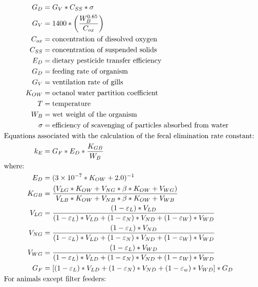 \documentclass[10pt]{article}
\begin{document}
\begin{align*}
G_{D} & = G_{V}*C_{SS}*\sigma \nonumber \\
G_{V} & = 1400*\left(\frac{W_{B}^{0.65}}{C_{ox}}\right) \nonumber \\
C_{ox} & = \text{concentration of dissolved oxygen} \nonumber\\
C_{SS} & = \text{concentration of suspended solids} \nonumber\\
E_{D} & = \text{dietary pesticide transfer efficiency} \nonumber\\
G_{D} & = \text{feeding rate of organism} \nonumber\\
G_{V} & = \text{ventilation rate of gills} \nonumber\\
K_{OW} & = \text{octanol water partition coefficient} \nonumber\\
T & = \text{temperature } \nonumber\\
W_{B} & = \text{wet weight of the organism} \nonumber\\
\sigma & = \text{efficiency of scavenging of particles absorbed from water} \nonumber\\
&    \hspace{-.75in}  \text{Equations associated with the calculation of the fecal elimination rate constant:} \nonumber \\
k_{E} & = G_{F}*E_{D}*\frac{K_{GB}}{W_{B}}\nonumber \\
&    \hspace{-.75in}  \text{where:} \nonumber \\
E_{D} & = (\num{.0000003}*K_{OW}+2.0)^{-1} \nonumber \\
K_{GB} & = \frac{(V_{LG}*K_{OW}+V_{NG}*\beta*K_{OW}+V_{WG})}{V_{LB}*K_{OW}+V_{NB}*\beta*K_{OW}+V_{WB}}\nonumber \\
V_{LG} & = \frac{(1-\varepsilon_{L})*V_{LD}}{(1-\varepsilon_{L})*V_{LD}+(1-\varepsilon_{N})*V_{ND}+(1-\varepsilon_{W})*V_{WD}}\nonumber \\
V_{NG} & = \frac{(1-\varepsilon_{L})*V_{ND}}{(1-\varepsilon_{L})*V_{LD}+(1-\varepsilon_{N})*V_{ND}+(1-\varepsilon_{W})*V_{WD}}\nonumber \\
V_{WG} & = \frac{(1-\varepsilon_{L})*V_{WD}}{(1-\varepsilon_{L})*V_{LD}+(1-\varepsilon_{N})*V_{ND}+(1-\varepsilon_{W})*V_{WD}}\nonumber \\
G_{F} & = [(1-\varepsilon_{L})*V_{LD}+(1-\varepsilon_{N})*V_{ND}+(1-\varepsilon_{w})*V_{WD}]*G_{D} \nonumber \\
&    \hspace{-.75in}  \text{For animals except filter feeders:} \nonumber \\

\end{align*}
\end{document}
